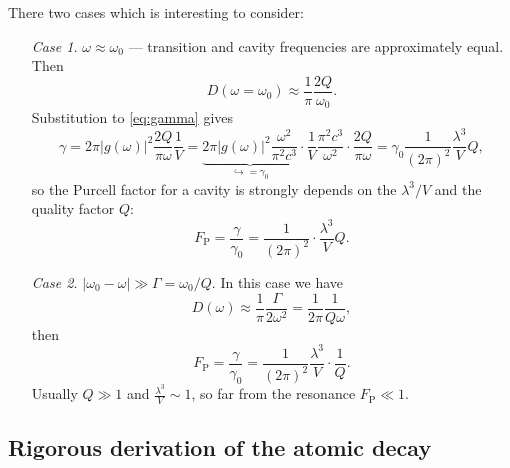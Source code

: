 There two cases which is interesting to consider:
\begin{enumerate}
	\item[\textit{Case 1.}] $\omega \approx \omega_0$ --- transition and cavity frequencies are approximately equal. Then
	\begin{equation}
		D(\omega = \omega_0) \approx \frac{1}{\pi} \frac{2Q}{\omega_0}.
	\end{equation}
	Substitution to \eqref{eq:gamma} gives
	\begin{equation}
		\gamma = 2\pi \left| g(\omega) \right|^2 \frac{2Q}{\pi \omega} \frac{1}{V} = \underbrace{2\pi \left| g(\omega) \right|^2 \frac{\omega^2}{\pi^2 c^3}}_{\hookrightarrow=\gamma_0} \cdot \frac{1}{V} \frac{\pi^2 c^3}{\omega^2} \cdot \frac{2Q}{\pi \omega} = \gamma_0 \frac{1}{\left(2\pi\right)^2} \frac{\lambda^3}{V} Q,
	\end{equation}
	so the Purcell factor for a cavity is strongly depends on the $\lambda^3/V$ and the quality factor $Q$:
	\begin{equation}
		\boxed{F_{\text{P}} = \frac{\gamma}{\gamma_0} = \frac{1}{\left(2\pi\right)^2} \cdot \frac{\lambda^3}{V} Q.}
	\end{equation}
	
	\item[\textit{Case 2.}] $\left|\omega_0 - \omega\right| \gg \Gamma = \omega_0 / Q$. In this case we have
	\begin{equation}
		D(\omega) \approx \frac{1}{\pi} \frac{\Gamma}{2 \omega^2} = \frac{1}{2\pi} \frac{1}{Q \omega},
	\end{equation}
	then
	\begin{equation}
		F_{\text{P}} = \frac{\gamma}{\gamma_0} = \frac{1}{\left(2\pi\right)^2} \frac{\lambda^3}{V} \cdot \frac{1}{Q}.
	\end{equation}
	Usually $Q \gg 1$ and $\frac{\lambda^3}{V} \sim 1$, so far from the resonance $F_{\text{P}} \ll 1$.
\end{enumerate}

\subsection{Rigorous derivation of the atomic decay}